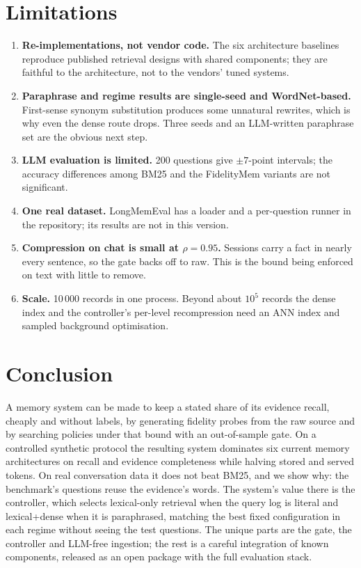 \documentclass[conference]{IEEEtran}
\begin{document}
\section{Limitations}
\begin{enumerate}
\item \textbf{Re-implementations, not vendor code.} The six architecture baselines reproduce published retrieval designs with shared components; they are faithful to the architecture, not to the vendors' tuned systems.
\item \textbf{Paraphrase and regime results are single-seed and WordNet-based.} First-sense synonym substitution produces some unnatural rewrites, which is why even the dense route drops. Three seeds and an LLM-written paraphrase set are the obvious next step.
\item \textbf{LLM evaluation is limited.} 200 questions give $\pm 7$-point intervals; the accuracy differences among BM25 and the FidelityMem variants are not significant.
\item \textbf{One real dataset.} LongMemEval has a loader and a per-question runner in the repository; its results are not in this version.
\item \textbf{Compression on chat is small at $\rho = 0.95$.} Sessions carry a fact in nearly every sentence, so the gate backs off to raw. This is the bound being enforced on text with little to remove.
\item \textbf{Scale.} 10\,000 records in one process. Beyond about $10^5$ records the dense index and the controller's per-level recompression need an ANN index and sampled background optimisation.
\end{enumerate}

\section{Conclusion}
A memory system can be made to keep a stated share of its evidence recall, cheaply and without labels, by generating fidelity probes from the raw source and by searching policies under that bound with an out-of-sample gate. On a controlled synthetic protocol the resulting system dominates six current memory architectures on recall and evidence completeness while halving stored and served tokens. On real conversation data it does not beat BM25, and we show why: the benchmark's questions reuse the evidence's words. The system's value there is the controller, which selects lexical-only retrieval when the query log is literal and lexical+dense when it is paraphrased, matching the best fixed configuration in each regime without seeing the test questions. The unique parts are the gate, the controller and LLM-free ingestion; the rest is a careful integration of known components, released as an open package with the full evaluation stack.
\end{document}
